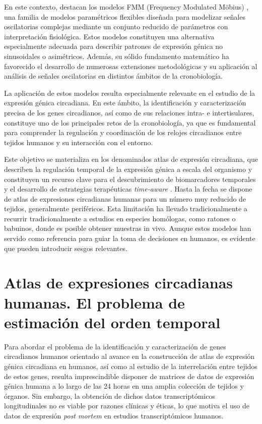 \documentclass[12pt, a4paper]{report}
\begin{document}
En este contexto, destacan los modelos FMM (Frequency Modulated Möbius) \cite{fmmAlgorithm}, una familia de modelos paramétricos flexibles diseñada para modelizar señales oscilatorias complejas mediante un conjunto reducido de parámetros con interpretación fisiológica. Estos modelos constituyen una alternativa especialmente adecuada para describir patrones de expresión génica no sinusoidales o asimétricos. Además, su sólido fundamento matemático ha favorecido el desarrollo de numerosas extensiones metodológicas y su aplicación  al análisis de señales oscilatorias en distintos ámbitos de la cronobiología.


La aplicación de estos modelos resulta especialmente relevante en el estudio de la expresión génica circadiana. En este ámbito, la identificación y caracterización precisa de los genes circadianos, así como de sus relaciones intra- e intertisulares, constituye uno de los principales retos de la cronobiología, ya que es fundamental para comprender la regulación y coordinación de los relojes circadianos entre tejidos humanos y su interacción con el entorno. 

Este objetivo se materializa en los denominados atlas de expresión circadiana, que describen la regulación temporal de la expresión génica a escala del organismo y constituyen un recurso clave para el descubrimiento de biomarcadores temporales y el desarrollo de estrategias terapéuticas \textit{time-aware} \cite{zhang2014, dyar2018, mure2018, ruben2018, wei2022, larriba2023}. Hasta la fecha se dispone de atlas de expresiones circadianas humanas para un número muy reducido de tejidos, generalmente periféricos. Esta limitación ha llevado tradicionalmente a recurrir tradicionalmente a estudios en especies homólogas, como ratones o babuinos, donde es posible obtener muestras in vivo. Aunque estos modelos han servido como referencia para guiar la toma de decisiones en humanos, es evidente que pueden introducir sesgos relevantes.

\section{Atlas de expresiones circadianas humanas. El problema de estimación del orden temporal}

Para abordar el problema de la identificación y caracterización de genes circadianos humanos orientado al avance en la construcción de atlas de expresión génica circadiana en humanos, así como al estudio de la interrelación entre tejidos de estos genes, resulta imprescindible disponer de matrices de datos de expresión génica humana a lo largo de las 24 horas en una amplia colección de tejidos y órganos. Sin embargo, la obtención de dichos datos transcriptómicos longitudinales no es viable por razones clínicas y éticas, lo que motiva el uso de datos de expresión \textit{post mortem} en estudios transcriptómicos humanos.
\end{document}

